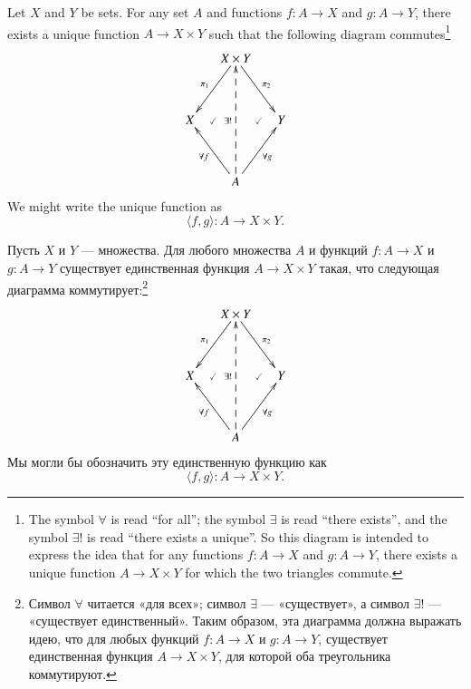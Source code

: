 \documentclass[a4paper]{book}
\def\to{\rightarrow}
\def\taking{\colon}
\def\la{\langle}
\def\ra{\rangle}
\newcommand{\prodmap}[2]{\la#1,#2\ra}
\theoremstyle{myth}
\newtheorem{lemmaENG}[envENG]{\begin{english}Lemma\end{english}}
\newtheorem{lemmaRUS}[envRUS]{\begin{russian}Лемма\end{russian}}
\begin{document}
\begin{english}
\begin{lemmaENG}\label{lemma:up for prod}
Let $X$ and $Y$ be sets. For any set $A$ and functions $f\taking A\to X$ and $g\taking A\to Y$, there exists a unique function $A\to X\times Y$ such that the following diagram commutes\footnote{The symbol $\forall$ is read “for all”; the symbol $\exists$ is read “there exists”, and the symbol $\exists!$ is read “there exists a unique”. So this diagram is intended to express the idea that for any functions $f\taking A\to X$ and $g\taking A\to Y$, there exists a unique function $A\to X\times Y$ for which the two triangles commute.}
\begin{align}\label{dia:univ prop for products}
\xymatrix@=15pt{&X\times Y\ar[ldd]_{\pi_1}\ar[rdd]^{\pi_2}\\\\X\ar@{}[r]|{\checkmark}&&Y\ar@{}[l]|{\checkmark}\\\\&A\ar[luu]^{\forall f}\ar[ruu]_{\forall g}\ar@{-->}[uuuu]^{\exists !}}
\end{align}
We might write the unique function as $$\prodmap{f}{g}\taking A\to X\times Y.$$
\end{lemmaENG}

\begin{lemmaRUS}\label{lemma:up for prod}
\begin{russian}Пусть $X$ и $Y$ — множества. Для любого множества $A$ и функций $f\taking A\to X$ и $g\taking A\to Y$ существует единственная функция $A\to X\times Y$ такая, что следующая диаграмма коммутирует:\footnote{Символ $\forall$ читается «для всех»; символ $\exists$ — «существует», а символ $\exists!$ — «существует единственный». Таким образом, эта диаграмма должна выражать идею, что для любых функций $f\taking A\to X$ и $g\taking A\to Y$, существует единственная функция $A\to X\times Y$, для которой оба треугольника коммутируют.}
\begin{align}\label{dia:univ prop for products}
\xymatrix@=15pt{&X\times Y\ar[ldd]_{\pi_1}\ar[rdd]^{\pi_2}\\\\X\ar@{}[r]|{\checkmark}&&Y\ar@{}[l]|{\checkmark}\\\\&A\ar[luu]^{\forall f}\ar[ruu]_{\forall g}\ar@{-->}[uuuu]^{\exists !}}
\end{align}
Мы могли бы обозначить эту единственную функцию как $$\prodmap{f}{g}\taking A\to X\times Y.$$\end{russian}
\end{lemmaRUS}


\end{english}
\end{document}

